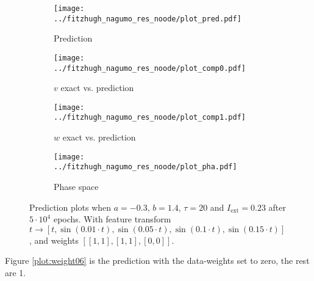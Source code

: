 \documentclass[a4paper]{article}
\begin{document}
\begin{figure}[H]
	\centering 
	\begin{subfigure}[b]{0.47\textwidth}
		\centering
		\texttt{[image: ../fitzhugh\_nagumo\_res\_noode/plot\_pred.pdf]}
		\caption{Prediction}
		\label{fig:weight05a}
	\end{subfigure}
	\begin{subfigure}[b]{0.47\textwidth}
		\centering
		\texttt{[image: ../fitzhugh\_nagumo\_res\_noode/plot\_comp0.pdf]}
		\caption{$v$ exact vs. prediction}
		\label{fig:weight05b}
	\end{subfigure}
	\begin{subfigure}[b]{0.47\textwidth}
		\centering
		\texttt{[image: ../fitzhugh\_nagumo\_res\_noode/plot\_comp1.pdf]}
		\caption{$w$ exact vs. prediction}
		\label{fig:weight05c}
	\end{subfigure}
	\begin{subfigure}[b]{0.47\textwidth}
		\centering
		\texttt{[image: ../fitzhugh\_nagumo\_res\_noode/plot\_pha.pdf]}
		\caption{Phase space}
		\label{fig:weight05d}
	\end{subfigure}
	\caption{Prediction plots when $a=-0.3$, $b=1.4$, $\tau=20$ and $ I_{\text{ext}}=0.23$ after $5\cdot10^4$ epochs. With feature transform $t \rightarrow \left[ t, \sin(0.01 \cdot  t), \sin(0.05 \cdot  t), \sin(0.1 \cdot  t), \sin(0.15 \cdot  t)\right] $, and weights $\left[ \left[ 1, 1\right], \left[ 1, 1\right], \left[ 0, 0\right]\right]$.}
	\label{plot:weight05}
\end{figure} 	

Figure \ref{plot:weight06} is the prediction with the data-weights set to zero, the rest are 1.
\end{document}

